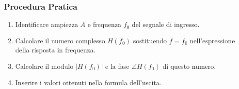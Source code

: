 \subsubsection{Procedura Pratica}
\begin{enumerate}
    \item Identificare ampiezza $A$ e frequenza $f_0$ del segnale di ingresso.
    \item Calcolare il numero complesso $H(f_0)$ sostituendo $f=f_0$ nell'espressione della risposta in frequenza.
    \item Calcolare il modulo $|H(f_0)|$ e la fase $\angle H(f_0)$ di questo numero.
    \item Inserire i valori ottenuti nella formula dell'uscita.
\end{enumerate}